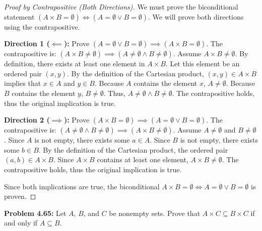 \documentclass[12pt]{article}
\theoremstyle{definition}
\theoremstyle{remark}
\begin{document}
\begin{proof}[Proof by Contrapositive (Both Directions)]
We must prove the biconditional statement $(A \times B = \emptyset) \iff (A = \emptyset \lor B = \emptyset)$. We will prove both directions using the contrapositive.

\textbf{Direction 1 ($\impliedby$):} Prove $(A = \emptyset \lor B = \emptyset) \implies (A \times B = \emptyset)$.
The contrapositive is: $(A \times B \neq \emptyset) \implies (A \neq \emptyset \land B \neq \emptyset)$.
Assume $A \times B \neq \emptyset$. By definition, there exists at least one element in $A \times B$. Let this element be an ordered pair $(x, y)$. By the definition of the Cartesian product, $(x, y) \in A \times B$ implies that $x \in A$ and $y \in B$. Because $A$ contains the element $x$, $A \neq \emptyset$. Because $B$ contains the element $y$, $B \neq \emptyset$. Thus, $A \neq \emptyset \land B \neq \emptyset$. The contrapositive holds, thus the original implication is true.

\textbf{Direction 2 ($\implies$):} Prove $(A \times B = \emptyset) \implies (A = \emptyset \lor B = \emptyset)$.
The contrapositive is: $(A \neq \emptyset \land B \neq \emptyset) \implies (A \times B \neq \emptyset)$.
Assume $A \neq \emptyset$ and $B \neq \emptyset$. Since $A$ is not empty, there exists some $a \in A$. Since $B$ is not empty, there exists some $b \in B$. By the definition of the Cartesian product, the ordered pair $(a, b) \in A \times B$. Since $A \times B$ contains at least one element, $A \times B \neq \emptyset$. The contrapositive holds, thus the original implication is true.

Since both implications are true, the biconditional $A \times B = \emptyset \iff A = \emptyset \lor B = \emptyset$ is proven.
\end{proof}

\vspace{0.5cm}

\textbf{Problem 4.65:} Let $A$, $B$, and $C$ be nonempty sets. Prove that $A \times C \subseteq B \times C$ if and only if $A \subseteq B$.
\end{document}
